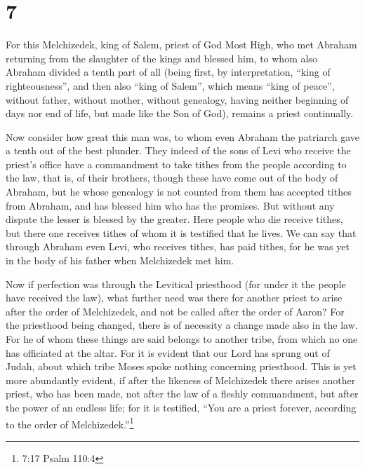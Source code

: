 \hypertarget{section-6}{%
\section{7}\label{section-6}}

 For this Melchizedek, king of Salem, priest of God Most
High, who met Abraham returning from the slaughter of the kings and
blessed him,  to whom also Abraham divided a tenth part of
all (being first, by interpretation, ``king of righteousness'', and then
also ``king of Salem'', which means ``king of peace'', 
without father, without mother, without genealogy, having neither
beginning of days nor end of life, but made like the Son of God),
remains a priest continually.

 Now consider how great this man was, to whom even Abraham
the patriarch gave a tenth out of the best plunder.  They
indeed of the sons of Levi who receive the priest's office have a
commandment to take tithes from the people according to the law, that
is, of their brothers, though these have come out of the body of
Abraham,  but he whose genealogy is not counted from them
has accepted tithes from Abraham, and has blessed him who has the
promises.  But without any dispute the lesser is blessed by
the greater.  Here people who die receive tithes, but there
one receives tithes of whom it is testified that he lives. 
We can say that through Abraham even Levi, who receives tithes, has paid
tithes,  for he was yet in the body of his father when
Melchizedek met him.

 Now if perfection was through the Levitical priesthood
(for under it the people have received the law), what further need was
there for another priest to arise after the order of Melchizedek, and
not be called after the order of Aaron?  For the priesthood
being changed, there is of necessity a change made also in the law.
 For he of whom these things are said belongs to another
tribe, from which no one has officiated at the altar.  For
it is evident that our Lord has sprung out of Judah, about which tribe
Moses spoke nothing concerning priesthood.  This is yet
more abundantly evident, if after the likeness of Melchizedek there
arises another priest,  who has been made, not after the
law of a fleshly commandment, but after the power of an endless life;
 for it is testified, ``You are a priest forever, according
to the order of Melchizedek.''\footnote{7:17 Psalm 110:4}

